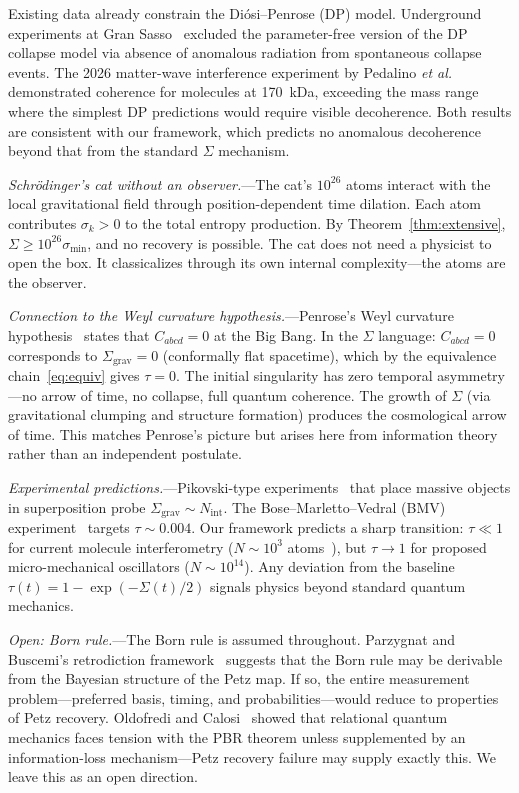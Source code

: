 \documentclass[prl,twocolumn,superscriptaddress,longbibliography,floatfix]{revtex4-2}
\newcommand{\tauasym}{\tau}
\newcommand{\Sgrav}{\Sigma_{\mathrm{grav}}}
\begin{document}
Existing data already constrain the Di\'{o}si--Penrose (DP) model.
Underground experiments at Gran Sasso~\cite{GranSasso2022}
excluded the parameter-free version of the DP collapse model via
absence of anomalous radiation from spontaneous collapse events.
The 2026 matter-wave interference experiment by Pedalino
\emph{et al.}~\cite{Pedalino2026} demonstrated coherence for
molecules at 170~kDa, exceeding the mass range where the simplest
DP predictions would require visible decoherence.  Both results are
consistent with our framework, which predicts no anomalous
decoherence beyond that from the standard $\Sigma$ mechanism.

\emph{Schr\"{o}dinger's cat without an observer.}---The cat's
$10^{26}$ atoms interact with the local gravitational field through
position-dependent time dilation.  Each atom contributes
$\sigma_k > 0$ to the total entropy production.  By
Theorem~\ref{thm:extensive}, $\Sigma \geq 10^{26}\sigma_{\min}$,
and no recovery is possible.  The cat does not need a
physicist to open the box.  It classicalizes through its own
internal complexity---the atoms are the observer.

\emph{Connection to the Weyl curvature hypothesis.}---Penrose's
Weyl curvature hypothesis~\cite{Penrose1979} states that
$C_{abcd} = 0$ at the Big Bang.  In the $\Sigma$ language:
$C_{abcd} = 0$ corresponds to $\Sgrav = 0$ (conformally flat
spacetime), which by the equivalence
chain~\eqref{eq:equiv} gives $\tauasym = 0$.  The initial
singularity has zero temporal asymmetry---no arrow of time, no
collapse, full quantum coherence.  The growth of $\Sigma$ (via
gravitational clumping and structure formation) produces the
cosmological arrow of time.  This matches Penrose's picture
but arises here from information theory rather than an
independent postulate.

\emph{Experimental predictions.}---Pikovski-type
experiments~\cite{Pikovski2015} that place massive objects in
superposition probe $\Sgrav \sim N_{\mathrm{int}}$.  The
Bose--Marletto--Vedral (BMV) experiment~\cite{Bose2017} targets
$\tauasym \sim 0.004$.  Our framework predicts a sharp transition:
$\tauasym \ll 1$ for current molecule interferometry
($N \sim 10^3$ atoms~\cite{Fein2019}), but $\tauasym \to 1$ for
proposed micro-mechanical oscillators ($N \sim 10^{14}$).  Any
deviation from the baseline
$\tauasym(t) = 1 - \exp(-\Sigma(t)/2)$ signals physics beyond
standard quantum mechanics.

\emph{Open: Born rule.}---The Born rule is assumed throughout.
Parzygnat and Buscemi's retrodiction framework~\cite{Parzygnat2023}
suggests that the Born rule may be derivable from the Bayesian
structure of the Petz map.  If so, the entire measurement
problem---preferred basis, timing, and probabilities---would reduce
to properties of Petz recovery.  Oldofredi and
Calosi~\cite{OldofrediCalosi2021} showed that relational quantum
mechanics faces tension with the PBR theorem unless supplemented by
an information-loss mechanism---Petz recovery failure may supply
exactly this.  We leave this as an open direction.
\end{document}
